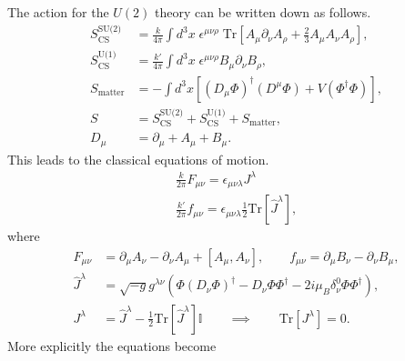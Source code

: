 The action for the $U(2)$ theory can be written down as follows.
\begin{align}
    S^{\text{SU(2)}}_{\text{CS}} &= \frac{k}{4 \pi} \int d^3x \; \epsilon^{\mu \nu \rho} \; \mathrm{Tr} \left[A_{\mu} \partial_{\nu}A_{\rho}+ \frac{2}{3} A_{\mu} A_{\nu}A_{\rho} \right], \\
    S^{\text{U(1)}}_{\text{CS}} &= \frac{k'}{4 \pi} \int d^3x \; \epsilon^{\mu \nu \rho} B_{\mu} \partial_{\nu} B_{\rho},\\
    S_{\text{matter}}&= - \int d^3x \left[ \left(D_{\mu} \Phi \right)^{\dag} \left(D^{\mu} \Phi \right) + V\left(\Phi^{\dag}\Phi \right)\right], \\
    S &= S^{\text{SU(2)}}_{\text{CS}} + S^{\text{U(1)}}_{\text{CS}} + S_{\text{matter}}, \\
    D_{\mu} &= \partial_{\mu} + A_{\mu}+B_{\mu}.
\end{align}
This leads to the classical equations of motion.
\begin{align}
    \frac{k}{2 \pi} F_{\mu \nu} = \epsilon_{\mu \nu \lambda} J^{\lambda}\\
    \frac{k'}{2\pi} f_{\mu \nu} = \epsilon_{\mu \nu \lambda} \frac{1}{2} \mathrm{Tr} \left[\hat{J}^{\lambda} \right],
\end{align}
where
\begin{align}
    F_{\mu \nu}&= \partial_{\mu} A_{\nu} - \partial_{\nu}A_{\mu} + [A_{\mu}, A_{\nu}], \qquad f_{\mu \nu} = \partial_{\mu} B_{\nu} - \partial_{\nu} B_{\mu}, \\
    \hat{J}^{\lambda} &= \sqrt{-g} g^{\lambda \nu} \left( \Phi \left( D_{\nu} \Phi\right)^{\dag} - D_{\nu} \Phi \Phi^{\dag}   -2i \mu_B \delta^0_{\nu} \Phi \Phi^{\dag}  \right), \\
    J^{\lambda} &= \hat{J}^{\lambda} - \frac{1}{2}\mathrm{Tr}\left[\hat{J}^{\lambda} \right]\mathbb{I} \qquad \implies \qquad \mathrm{Tr}\left[J^{\lambda}\right]=0.
\end{align}
More explicitly the equations become
